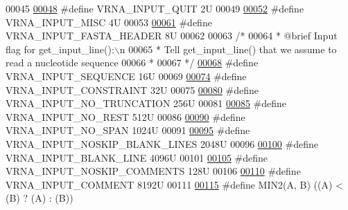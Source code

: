 \begin{DoxyCode}
00045 
\mbox{\hyperlink{group__utils_ga72f3c6ca5c83d2b9baed2922d19c403d}{00048}} \textcolor{preprocessor}{#define VRNA\_INPUT\_QUIT                   2U}
00049 
\mbox{\hyperlink{group__utils_ga8e3241b321c9c1a78a69e59e2e019a71}{00052}} \textcolor{preprocessor}{#define VRNA\_INPUT\_MISC                   4U}
00053 
\mbox{\hyperlink{group__utils_ga2f0d8069e93d3ac54d9320d6bdb8e7e7}{00061}} \textcolor{preprocessor}{#define VRNA\_INPUT\_FASTA\_HEADER           8U}
00062 
00063 \textcolor{comment}{/*}
00064 \textcolor{comment}{ *  @brief  Input flag for get\_input\_line():\(\backslash\)n}
00065 \textcolor{comment}{ *  Tell get\_input\_line() that we assume to read a nucleotide sequence}
00066 \textcolor{comment}{ * }
00067 \textcolor{comment}{ */}
\mbox{\hyperlink{group__utils_ga8566d6787972100e68b5a2a159b4cf45}{00068}} \textcolor{preprocessor}{#define VRNA\_INPUT\_SEQUENCE               16U}
00069 
\mbox{\hyperlink{group__utils_gac08a9df45b9721b97a47dbfe7a6e5f85}{00074}} \textcolor{preprocessor}{#define VRNA\_INPUT\_CONSTRAINT             32U}
00075 
\mbox{\hyperlink{group__utils_ga086742158293217a46ae2f71bb296937}{00080}} \textcolor{preprocessor}{#define VRNA\_INPUT\_NO\_TRUNCATION          256U}
00081 
\mbox{\hyperlink{group__utils_ga7a2e8c50a0c7ce82e60da1016e1367fd}{00085}} \textcolor{preprocessor}{#define VRNA\_INPUT\_NO\_REST                512U}
00086 
\mbox{\hyperlink{group__utils_ga0de536599b881c787b0943a2671da476}{00090}} \textcolor{preprocessor}{#define VRNA\_INPUT\_NO\_SPAN                1024U}
00091 
\mbox{\hyperlink{group__utils_gab4db885222b3b69608310d7c7e63e286}{00095}} \textcolor{preprocessor}{#define VRNA\_INPUT\_NOSKIP\_BLANK\_LINES     2048U}
00096 
\mbox{\hyperlink{group__utils_ga305474b93ccb79ae4c7754016a8ddd84}{00100}} \textcolor{preprocessor}{#define VRNA\_INPUT\_BLANK\_LINE             4096U}
00101 
\mbox{\hyperlink{group__utils_ga0f6311f11bed1842e3a527ab27b294c6}{00105}} \textcolor{preprocessor}{#define VRNA\_INPUT\_NOSKIP\_COMMENTS        128U}
00106 
\mbox{\hyperlink{group__utils_gaf2062e0eeefffd3ed639af460b3d4fab}{00110}} \textcolor{preprocessor}{#define VRNA\_INPUT\_COMMENT                8192U}
00111 
\mbox{\hyperlink{group__utils_gae0b9cd0ce090bd69b951aa73e8fa4f7d}{00115}} \textcolor{preprocessor}{#define MIN2(A, B)      ((A) < (B) ? (A) : (B))}

\end{DoxyCode}
